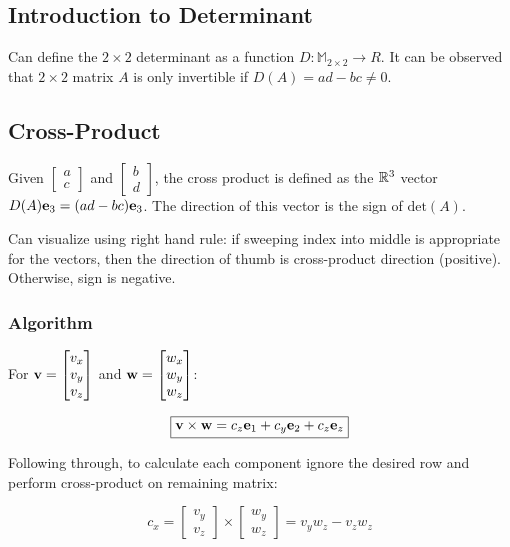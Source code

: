 \subsection{Introduction to Determinant}

Can define the $2\times 2$ determinant as a function $D:\mathbb{M}_{2\times2}\rightarrow R$.
It can be observed that $2\times 2$ matrix $A$ is only invertible if $D(A)=ad-bc\neq 0$.

\subsection{Cross-Product}

Given $\begin{bmatrix}a\\ c\end{bmatrix}$ and $\begin{bmatrix}b\\ d\end{bmatrix}$, the cross
product is defined as the $\mathbb{R}^3$ vector $D(A)\textbf{e}_3=(ad-bc)\textbf{e}_3$. The direction
of this vector is the sign of $\mathrm{det}(A)$.

\noindent
Can visualize using right hand rule: if sweeping index into middle is appropriate for the vectors,
then the direction of thumb is cross-product direction (positive). Otherwise, sign is negative.

\subsubsection{Algorithm}

For $\textbf{v}=\begin{bmatrix}v_x\\ v_y\\ v_z\end{bmatrix}$ and $\textbf{w}=\begin{bmatrix}w_x\\ w_y\\ w_z\end{bmatrix}$:

\[\boxed{\textbf{v}\times\textbf{w}=c_z\textbf{e}_1+c_y\textbf{e}_2+c_z\textbf{e}_z}\]

Following through, to calculate each component ignore the desired row and perform cross-product on remaining matrix:

\[c_x=\begin{bmatrix}v_y\\ v_z\end{bmatrix}\times \begin{bmatrix}w_y\\ w_z\end{bmatrix}=v_yw_z-v_zw_z\]


